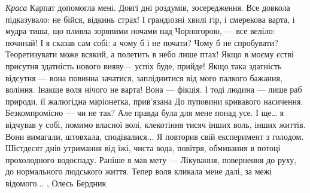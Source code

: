 \emph{Краса} Карпат допомогла мені. Довгі дні роздумів, зосередження. Все
довкола підказувало: не бійся, відкинь страх! І грандіозні хвилі гір, і
смерекова варта, і мудра тиша, що пливла зоряними ночами над Чорногорою, — все
веліло: починай!  І я сказав сам собі: а чому б і не почати? Чому б не
спробувати? Теоретизувати може всякий, а полетить в небо лише птах! Якщо в
моєму єстві присутня здатність нового вияву— успіх буде, прийде! Якщо така
здатність відсутня — вона повинна зачатися, запліднитися від мого палкого
бажання, воління. Інакше воля нічого не варта! Вона — фікція. І тоді людина —
лише раб природи, її жалюгідна маріонетка, прив’язана До пуповини кривавого
насичення. Безкомпромісно — чи не так? Але правда була для мене понад усе. І
ще… я відчував у собі, помимо власної волі, клекотіння тисяч інших воль, інших
життів. Вони вимагали, штовхала, сподівалися...  Я повторив свій експеримент з
голодом. Шістдесят днів утримання від їжі, чиста вода, повітря, обмивання в
потоці прохолодного водоспаду. Раніше я мав мету — Лікування, повернення до
руху, до нормального людського життя. Тепер воля кликала мене далі, за межі
відомого...
, Олесь Бердник
